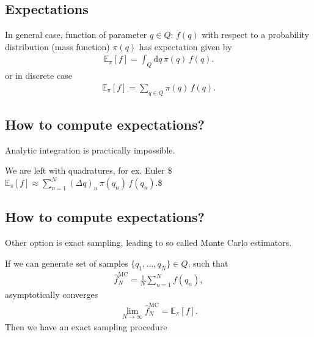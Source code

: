 \documentclass[letterpaper,10pt,english]{jupyterBook}
\begin{document}
\subsection{Expectations}
\label{\detokenize{Lecture 3:expectations}}
\sphinxAtStartPar
In general case, function of parameter \(q\in Q\): \(f(q)\)  with respect to a probability distribution (mass function) \(\pi(q)\) has expectation given by
\begin{equation*}
\begin{split}
\mathbb{E}_{\pi}[f] = \int_{Q} \mathrm{d} q \, \pi(q) \, f(q).
\end{split}
\end{equation*}
\sphinxAtStartPar
or in discrete case
\begin{equation*}
\begin{split}
\mathbb{E}_{\pi}[f] = \sum_{q \in Q} \pi(q) \, f(q).
\end{split}
\end{equation*}

\subsection{How to compute expectations?}
\label{\detokenize{Lecture 3:how-to-compute-expectations}}
\sphinxAtStartPar
Analytic integration is practically impossible.

\sphinxAtStartPar
We are left with quadratures, for ex. Euler
\$\(
\mathbb{E}_{\pi}[f] \approx 
\sum_{n = 1}^{N} (\Delta q)_{n} \, \pi(q_{n}) \, f(q_{n}).
\)\$


\subsection{How to compute expectations?}
\label{\detokenize{Lecture 3:id1}}
\sphinxAtStartPar
Other option is exact sampling, leading to so called Monte Carlo estimators.

\sphinxAtStartPar
If we can generate set of samples \(\{ q_{1}, \ldots, q_{N} \} \in Q\), such that
\begin{equation*}
\begin{split}\hat{f}_{N}^{\text{MC}} = \frac{1}{N} \sum_{n = 1}^{N} f(q_{n}),\end{split}
\end{equation*}
\sphinxAtStartPar
asymptotically converges
\begin{equation*}
\begin{split}
\lim_{N \rightarrow \infty} \hat{f}_{N}^{\text{MC}} = \mathbb{E}_{\pi}[f].
\end{split}
\end{equation*}
\sphinxAtStartPar
Then we have an exact sampling procedure
\end{document}

